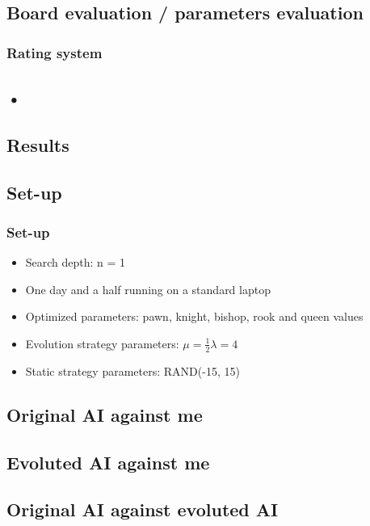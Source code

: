 \documentclass{beamer}
\begin{document}
\begin{frame}
\subsection{Board evaluation / parameters evaluation}

\subsubsection{Rating system}
\subsection{•}
\end{frame}



\begin{frame}
\end{frame}

\begin{frame}
\end{frame}

\begin{frame}
\end{frame}

\begin{frame}

\end{frame}

\begin{frame}
\section{Results}
\subsection{Set-up}
\frametitle{Set-up}
\begin{itemize}
\item Search depth: n = 1
\item One day and a half running on a standard laptop
\item Optimized parameters: pawn, knight, bishop, rook and queen values
\item Evolution strategy parameters: $\mu = \frac{1}{2} \lambda = 4$
\item Static strategy parameters: RAND(-15, 15)
\end{itemize}
\end{frame}

\begin{frame}
\subsection{Original AI against me}
\subsection{Evoluted AI against me}
\subsection{Original AI against evoluted AI}
\end{frame}
\end{document}

